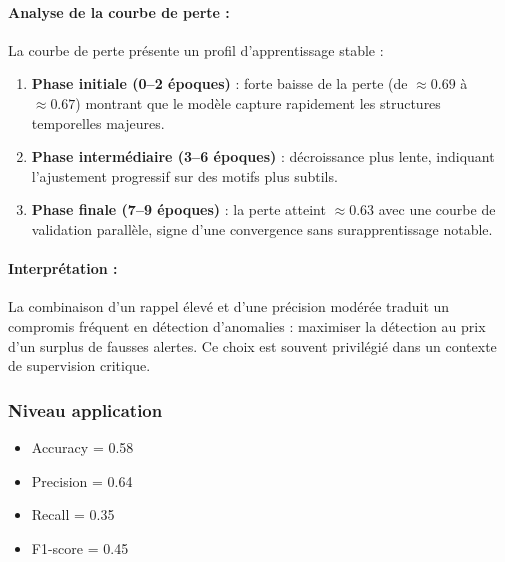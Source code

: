 \documentclass[a4paper,12pt]{report}
\begin{document}
\paragraph{Analyse de la courbe de perte :}
La courbe de perte présente un profil d’apprentissage stable :
\begin{enumerate}
    \item \textbf{Phase initiale (0--2 époques)} : forte baisse de la perte (de $\approx 0.69$ à $\approx 0.67$) montrant que le modèle capture rapidement les structures temporelles majeures.
    \item \textbf{Phase intermédiaire (3--6 époques)} : décroissance plus lente, indiquant l’ajustement progressif sur des motifs plus subtils.
    \item \textbf{Phase finale (7--9 époques)} : la perte atteint $\approx 0.63$ avec une courbe de validation parallèle, signe d’une convergence sans surapprentissage notable.
\end{enumerate}

\paragraph{Interprétation :}
La combinaison d’un rappel élevé et d’une précision modérée traduit un compromis fréquent en détection d’anomalies : maximiser la détection au prix d’un surplus de fausses alertes.  
Ce choix est souvent privilégié dans un contexte de supervision critique.

\subsubsection*{Niveau application}

\begin{itemize}
    \item Accuracy = 0.58
    \item Precision = 0.64
    \item Recall = 0.35
    \item F1-score = 0.45
\end{itemize}
\end{document}
